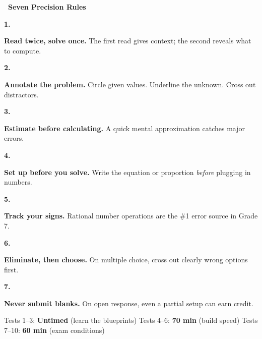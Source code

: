 {\vspace{2mm}

\noindent\textcolor{funBlueDark}{\large\bfseries\faRulerCombined~Seven Precision Rules}

\vspace{2mm}

\newcommand{\precisionRule}[3]{%
    \noindent
    \begin{minipage}[t]{0.06\linewidth}
        \centering
        \textcolor{#2}{\fontsize{16}{16}\selectfont\bfseries #1.}
    \end{minipage}%
    \begin{minipage}[t]{0.92\linewidth}
        \small #3
    \end{minipage}
    \vspace{2mm}
}

\precisionRule{1}{funBlue}{%
    \textbf{Read twice, solve once.} The first read gives context; the second reveals what to compute.
}
\precisionRule{2}{funTeal}{%
    \textbf{Annotate the problem.} Circle given values. Underline the unknown. Cross out distractors.
}
\precisionRule{3}{funPurple}{%
    \textbf{Estimate before calculating.} A quick mental approximation catches major errors.
}
\precisionRule{4}{funGreen}{%
    \textbf{Set up before you solve.} Write the equation or proportion \textit{before} plugging in numbers.
}
\precisionRule{5}{funOrange}{%
    \textbf{Track your signs.} Rational number operations are the \#1 error source in Grade 7.
}
\precisionRule{6}{funPink}{%
    \textbf{Eliminate, then choose.} On multiple choice, cross out clearly wrong options first.
}
\precisionRule{7}{funRed}{%
    \textbf{Never submit blanks.} On open response, even a partial setup can earn credit.
}

\vspace{2mm}

\begin{tcolorbox}[
    enhanced,
    colback=funBlue!4,
    colframe=funBlue!30,
    arc=4pt, boxrule=0.8pt,
    left=5mm, right=5mm, top=3mm, bottom=3mm,
    title={\small\textcolor{white}{\faClock~Timing Blueprint}},
    colbacktitle=funBlue!55,
    fonttitle=\bfseries\sffamily,
    borderline west={3pt}{0pt}{funBlue!40},
]
    \small\centering
    Tests 1--3: \textbf{Untimed} (learn the blueprints)
    \quad\textcolor{funBlue!40}{\faAngleRight}\quad
    Tests 4--6: \textbf{70 min} (build speed)
    \quad\textcolor{funBlue!40}{\faAngleRight}\quad
    Tests 7--10: \textbf{60 min} (exam conditions)
\end{tcolorbox}

}
